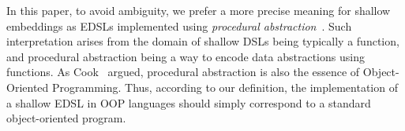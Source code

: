 \begin{comment}
For example, in their work
on EDSLs~\cite{}, Gibbons and Wu claim that deep embeddings (which
encode ASTs using algebraic datatypes in Haskell) allow adding new DSL
interpretations easily, but they make adding new language constructs
difficult. In contrast Gibbons and Wu claim that shallow embeddings
have dual modularity properties: new cases are easy to add, but new
interpretations are hard.  However what if, instead of using Haskell
and algebraic datatypes, one uses an OO language to encode an AST, for
example with the {\sc Composite} pattern.  Would this OO approach be
classified as a shallow or deep embedding? We believe arguments can be
made both ways. Since the {\sc Composite}
pattern is normally accepted to be a way to encode ASTs, it would be
reasonable to say that \emph{according to definition of deep embedding
  above, the OO approach classifies as a deep
  embedding}. Unfortunatelly this interpretation could be problematic.
As the Expression Problem~\cite{} tell us,
in the OO approach adding new language constructs is easy, but adding
interpretations is hard. Thus this would contradict Gibbons and Wu's
claims, since we have an AST representation (i.e. a deep embedding)
with the modularity properties of shallow embeddings.

We believe that the core of problem is that ASTs can be represented in
multiple ways. In particular, it is well know that functions alone are
enough to encode datastructures such as ASTs (via Church
encodings~\cite{}).  Distinguishing deep and shallow embeddings based
solely on whether a ``real'' datastructure is being used or not is
misleading.  Moreover, it gives the impression that shallow embeddings
are significantly less expressive than deep embeddings, because they
do not have access to the datastructure.
Gibbons and Wu themselves feel uneasy with the definition of shallow 
embeddings when they say:
``\emph{So it turns out that the syntax of the DSL is not really as ephemeral
in a shallow embedding as Boulton's choice of terms suggests.}''
\end{comment}

In this paper, to avoid ambiguity, we prefer a more precise meaning
for shallow embeddings as EDSLs implemented using \emph{procedural abstraction}~\cite{reynolds94proceduralabstraction}. Such
interpretation arises from the domain of shallow DSLs being
typically a function, and procedural abstraction being a way to encode
data abstractions using functions. As Cook~\cite{cook09abstraction} argued,
procedural abstraction is also the essence of Object-Oriented
Programming. Thus, according to our definition, the implementation of a shallow
EDSL in OOP languages should simply correspond to a standard
object-oriented program.

